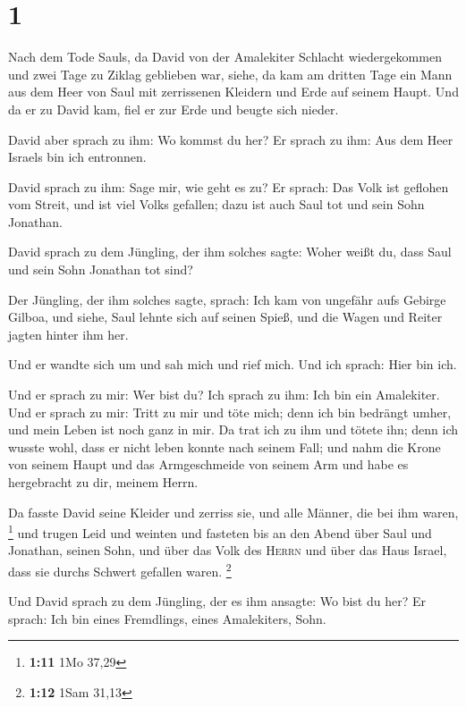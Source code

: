 \hypertarget{section}{%
\section{1}\label{section}}

 Nach dem Tode Sauls, da David von der Amalekiter Schlacht
wiedergekommen und zwei Tage zu Ziklag geblieben war, 
siehe, da kam am dritten Tage ein Mann aus dem Heer von Saul mit
zerrissenen Kleidern und Erde auf seinem Haupt. Und da er zu David kam,
fiel er zur Erde und beugte sich nieder.

 David aber sprach zu ihm: Wo kommst du her? Er sprach zu
ihm: Aus dem Heer Israels bin ich entronnen.

 David sprach zu ihm: Sage mir, wie geht es zu? Er sprach:
Das Volk ist geflohen vom Streit, und ist viel Volks gefallen; dazu ist
auch Saul tot und sein Sohn Jonathan.

 David sprach zu dem Jüngling, der ihm solches sagte:
Woher weißt du, dass Saul und sein Sohn Jonathan tot sind?

 Der Jüngling, der ihm solches sagte, sprach: Ich kam von
ungefähr aufs Gebirge Gilboa, und siehe, Saul lehnte sich auf seinen
Spieß, und die Wagen und Reiter jagten hinter ihm her.

 Und er wandte sich um und sah mich und rief mich. Und ich
sprach: Hier bin ich.

 Und er sprach zu mir: Wer bist du? Ich sprach zu ihm: Ich
bin ein Amalekiter.  Und er sprach zu mir: Tritt zu mir
und töte mich; denn ich bin bedrängt umher, und mein Leben ist noch ganz
in mir.  Da trat ich zu ihm und tötete ihn; denn ich
wusste wohl, dass er nicht leben konnte nach seinem Fall; und nahm die
Krone von seinem Haupt und das Armgeschmeide von seinem Arm und habe es
hergebracht zu dir, meinem Herrn.

 Da fasste David seine Kleider und zerriss sie, und alle
Männer, die bei ihm waren, \footnote{\textbf{1:11} 1Mo 37,29}
 und trugen Leid und weinten und fasteten bis an den
Abend über Saul und Jonathan, seinen Sohn, und über das Volk des
\textsc{Herrn} und über das Haus Israel, dass sie durchs Schwert
gefallen waren. \footnote{\textbf{1:12} 1Sam 31,13}

 Und David sprach zu dem Jüngling, der es ihm ansagte: Wo
bist du her? Er sprach: Ich bin eines Fremdlings, eines Amalekiters,
Sohn.


